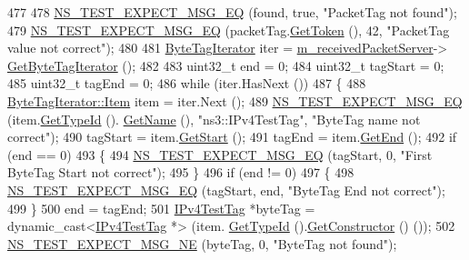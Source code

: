 \begin{DoxyCode}
477 
478       \hyperlink{group__testing_ga7304ba46a28d8cf08dfdfd6499cf7068}{NS\_TEST\_EXPECT\_MSG\_EQ} (found, \textcolor{keyword}{true}, \textcolor{stringliteral}{"PacketTag not found"});
479       \hyperlink{group__testing_ga7304ba46a28d8cf08dfdfd6499cf7068}{NS\_TEST\_EXPECT\_MSG\_EQ} (packetTag.\hyperlink{classIPv4TestTag_a08214d998ffb2812da56dd9d5dca7da7}{GetToken} (), 42, \textcolor{stringliteral}{"PacketTag value not
       correct"});
480 
481       \hyperlink{classns3_1_1ByteTagIterator}{ByteTagIterator} iter = \hyperlink{classIpv4FragmentationTest_a1cda7da1e37a2413ce73e54a395ecf4a}{m\_receivedPacketServer}->
      \hyperlink{classns3_1_1Packet_a3c03f35c267e8534c29bdaa4686e4823}{GetByteTagIterator} ();
482 
483       uint32\_t end = 0;
484       uint32\_t tagStart = 0;
485       uint32\_t tagEnd = 0;
486       \textcolor{keywordflow}{while} (iter.HasNext ())
487         \{
488           \hyperlink{classns3_1_1ByteTagIterator_1_1Item}{ByteTagIterator::Item} item = iter.Next ();
489           \hyperlink{group__testing_ga7304ba46a28d8cf08dfdfd6499cf7068}{NS\_TEST\_EXPECT\_MSG\_EQ} (item.\hyperlink{classns3_1_1ByteTagIterator_1_1Item_aaae5fe08c2b67ac485faa4372fe38cea}{GetTypeId} ().
      \hyperlink{classns3_1_1TypeId_aa3c41c79ae428b3cb396a9c6bb3ef314}{GetName} (), \textcolor{stringliteral}{"ns3::IPv4TestTag"}, \textcolor{stringliteral}{"ByteTag name not correct"});
490           tagStart = item.\hyperlink{classns3_1_1ByteTagIterator_1_1Item_abaf7c97dec29431934732d656361d13c}{GetStart} ();
491           tagEnd = item.\hyperlink{classns3_1_1ByteTagIterator_1_1Item_a47e206d7530bd378c26a55f206deefea}{GetEnd} ();
492           \textcolor{keywordflow}{if} (end == 0)
493             \{
494               \hyperlink{group__testing_ga7304ba46a28d8cf08dfdfd6499cf7068}{NS\_TEST\_EXPECT\_MSG\_EQ} (tagStart, 0, \textcolor{stringliteral}{"First ByteTag Start not correct"});
495             \}
496           \textcolor{keywordflow}{if} (end != 0)
497             \{
498               \hyperlink{group__testing_ga7304ba46a28d8cf08dfdfd6499cf7068}{NS\_TEST\_EXPECT\_MSG\_EQ} (tagStart, end, \textcolor{stringliteral}{"ByteTag End not correct"});
499             \}
500           end = tagEnd;
501           \hyperlink{classIPv4TestTag}{IPv4TestTag} *byteTag = \textcolor{keyword}{dynamic\_cast<}\hyperlink{classIPv4TestTag}{IPv4TestTag} *\textcolor{keyword}{>} (item.
      \hyperlink{classns3_1_1ByteTagIterator_1_1Item_aaae5fe08c2b67ac485faa4372fe38cea}{GetTypeId} ().\hyperlink{classns3_1_1TypeId_ad9b0bc71ee7593a1ff23ff8d53938e95}{GetConstructor} () ());
502           \hyperlink{group__testing_ga6d4b162d26b8a930115b97dd5f3d9ed9}{NS\_TEST\_EXPECT\_MSG\_NE} (byteTag, 0, \textcolor{stringliteral}{"ByteTag not found"});

\end{DoxyCode}
